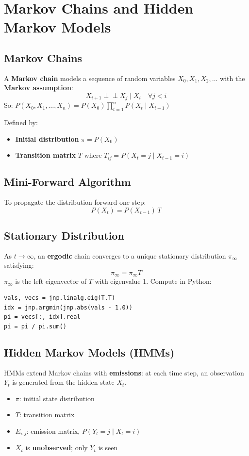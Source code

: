 \documentclass[11pt]{article}
\begin{document}
\section{Markov Chains and Hidden Markov Models}

\subsection{Markov Chains}
A \textbf{Markov chain} models a sequence of random variables $X_0, X_1, X_2, \ldots$ with the \textbf{Markov assumption}:
\[
  X_{i+1} \perp\!\!\!\perp X_j \mid X_i \quad \forall j < i
\]
So: $P(X_0, X_1, \ldots, X_n) = P(X_0)\prod_{t=1}^n P(X_t \mid X_{t-1})$

Defined by:
\begin{itemize}
  \item \textbf{Initial distribution} $\pi = P(X_0)$
  \item \textbf{Transition matrix} $T$ where $T_{ij} = P(X_t = j \mid X_{t-1} = i)$
\end{itemize}

\subsection{Mini-Forward Algorithm}
To propagate the distribution forward one step:
\[
  P(X_t) = P(X_{t-1})\,T
\]

\subsection{Stationary Distribution}
As $t \to \infty$, an \textbf{ergodic} chain converges to a unique stationary distribution $\pi_\infty$ satisfying:
\[
  \pi_\infty = \pi_\infty T
\]
$\pi_\infty$ is the left eigenvector of $T$ with eigenvalue 1. Compute in Python:
\begin{lstlisting}
vals, vecs = jnp.linalg.eig(T.T)
idx = jnp.argmin(jnp.abs(vals - 1.0))
pi = vecs[:, idx].real
pi = pi / pi.sum()
\end{lstlisting}

\subsection{Hidden Markov Models (HMMs)}
HMMs extend Markov chains with \textbf{emissions}: at each time step, an observation $Y_t$ is generated from the hidden state $X_t$.
\begin{itemize}
  \item $\pi$: initial state distribution
  \item $T$: transition matrix
  \item $E_{i,j}$: emission matrix, $P(Y_t = j \mid X_t = i)$
  \item $X_t$ is \textbf{unobserved}; only $Y_t$ is seen
\end{itemize}
\end{document}
